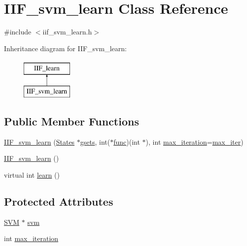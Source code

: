 \hypertarget{classIIF__svm__learn}{}\section{I\+I\+F\+\_\+svm\+\_\+learn Class Reference}
\label{classIIF__svm__learn}


{\ttfamily \#include $<$iif\+\_\+svm\+\_\+learn.\+h$>$}

Inheritance diagram for I\+I\+F\+\_\+svm\+\_\+learn\+:\begin{figure}[H]
\begin{center}
\leavevmode
\includegraphics[height=2.000000cm]{classIIF__svm__learn}
\end{center}
\end{figure}
\subsection*{Public Member Functions}
\begin{DoxyCompactItemize}
\item 
\hyperlink{classIIF__svm__learn_a2f7879f8999cb2239f6e06abdb6167c9}{I\+I\+F\+\_\+svm\+\_\+learn} (\hyperlink{classStates}{States} $\ast$\hyperlink{classIIF__learn_a2c2157269ef33cd2881ed48c5b38946a}{gsets}, int($\ast$\hyperlink{classIIF__learn_a19119795c6b5360d2e8b3ed2073642d6}{func})(int $\ast$), int \hyperlink{classIIF__svm__learn_a04b3b7f73edd164462d4923a74189670}{max\+\_\+iteration}=\hyperlink{config_8h_a7a2c49f1d0b87e326420efb7e71cb89f}{max\+\_\+iter})
\item 
\hyperlink{classIIF__svm__learn_a8f6006d617edad515c5f96061843b6cf}{I\+I\+F\+\_\+svm\+\_\+learn} ()
\item 
virtual int \hyperlink{classIIF__svm__learn_a5c84275525dbd8140e06f83d33d78b97}{learn} ()
\end{DoxyCompactItemize}
\subsection*{Protected Attributes}
\begin{DoxyCompactItemize}
\item 
\hyperlink{classSVM}{S\+VM} $\ast$ \hyperlink{classIIF__svm__learn_a0b23f4e2e73ecbdd3755fde75f3c3bc9}{svm}
\item 
int \hyperlink{classIIF__svm__learn_a04b3b7f73edd164462d4923a74189670}{max\+\_\+iteration}
\end{DoxyCompactItemize}

